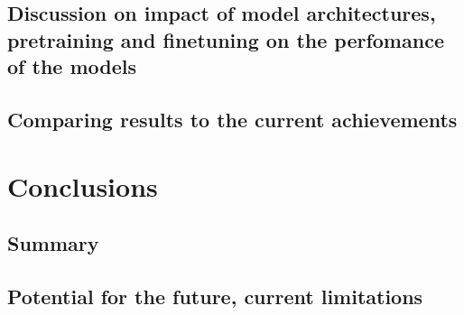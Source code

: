 \documentclass[a4paper,12pt]{report}
\begin{document}
\section{Discussion on impact of model architectures, pretraining and finetuning on the perfomance of the models}
\section{Comparing results to the current achievements}


\chapter{Conclusions}\label{cap:conclusions}
\section{Summary}
\section{Potential for the future, current limitations}



    
    
\end{document}
